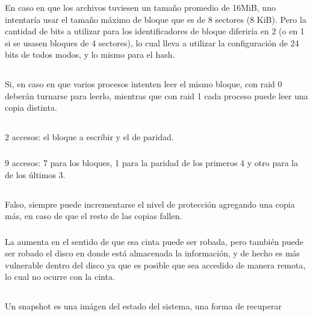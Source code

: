 \subsubsection{}
En caso en que los archivos tuviesen un tamaño promedio de 16MiB, uno
intentaría usar el tamaño máximo de bloque que es de 8 sectores (8 KiB). Pero
la cantidad de bits a utilizar para los identificadores de bloque diferiría
en 2 (o en 1 si se usasen bloques de 4 sectores), lo cual lleva a utilizar la
configuración de 24 bits de todos modos, y lo mismo para el hash.

\subsection{}
Si, en caso en que varios procesos intenten leer el mismo bloque, con raid 0
deberán turnarse para leerlo, mientras que con raid 1 cada proceso puede leer
una copia distinta.

\subsection{}

\subsubsection{}
2 accesos: el bloque a escribir y el de paridad.

\subsubsection{}
9 accesos: 7 para los bloques, 1 para la paridad de los primeros 4 y otro para
la de los últimos 3.

\setcounter{subsection}{7}
\subsection{}

\subsubsection{}
Falso, siempre puede incrementarse el nivel de protección agregando una copia
más, en caso de que el resto de las copias fallen.

\subsubsection{}
La aumenta en el sentido de que esa cinta puede ser robada, pero también puede
ser robado el disco en donde está almacenada la información, y de hecho es más
vulnerable dentro del disco ya que es posible que sea accedido de manera
remota, lo cual no ocurre con la cinta.

\subsection{}
Un snapshot es una imágen del estado del sistema, una forma de recuperar